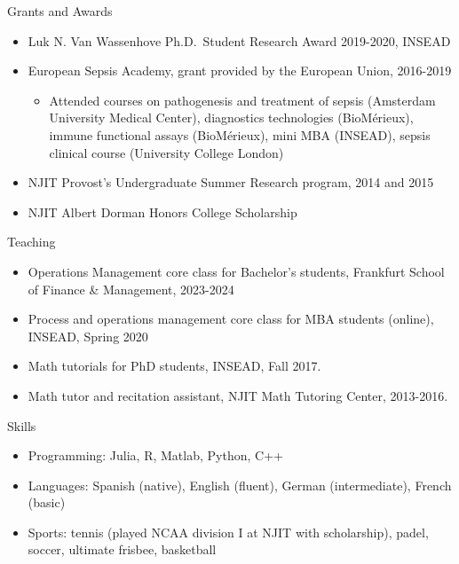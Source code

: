\documentclass{resume}
\begin{document}
\begin{rSection}{Grants and Awards}

\begin{itemize}
\item Luk N. Van Wassenhove Ph.D.\ Student Research Award 2019-2020, INSEAD
\item European Sepsis Academy, grant provided by the European Union, 2016-2019
\begin{itemize}
  \item Attended courses on pathogenesis and treatment of sepsis (Amsterdam University Medical Center), diagnostics technologies (BioM\'erieux), immune functional assays (BioM\'erieux), mini MBA (INSEAD), sepsis clinical course (University College London)
\end{itemize}
\item NJIT Provost's Undergraduate Summer Research program, 2014 and 2015
\item NJIT Albert Dorman Honors College Scholarship
\end{itemize}

\begin{rSection}{Teaching}
\begin{itemize}
\item Operations Management core class for Bachelor's students, Frankfurt School of Finance \& Management, 2023-2024
\item Process and operations management core class for MBA students (online), INSEAD, Spring 2020
\item Math tutorials for PhD students, INSEAD, Fall 2017.
\item Math tutor and recitation assistant, NJIT Math Tutoring Center, 2013-2016.
\end{itemize}

\end{rSection}


\end{rSection}

\begin{rSection}{Skills}
\begin{itemize}
\item Programming: Julia, R, Matlab, Python, C++
\item Languages: Spanish (native), English (fluent), German (intermediate), French (basic)
\item Sports: tennis (played NCAA division I at NJIT with scholarship), padel, soccer, ultimate frisbee, basketball
\end{itemize}

\end{rSection}
\end{document}
